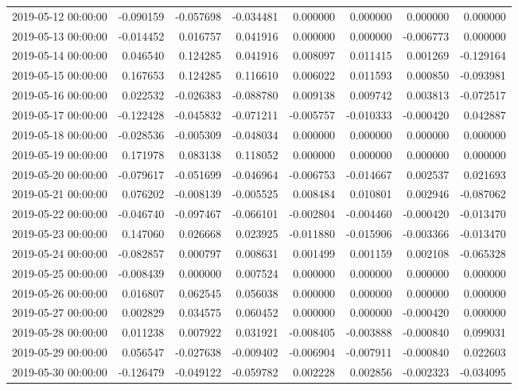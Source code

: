\begin{tabular}{lrrrrrrr}
2019-05-12 00:00:00 & -0.090159 & -0.057698 & -0.034481 & 0.000000 & 0.000000 & 0.000000 & 0.000000 \\
2019-05-13 00:00:00 & -0.014452 & 0.016757 & 0.041916 & 0.000000 & 0.000000 & -0.006773 & 0.000000 \\
2019-05-14 00:00:00 & 0.046540 & 0.124285 & 0.041916 & 0.008097 & 0.011415 & 0.001269 & -0.129164 \\
2019-05-15 00:00:00 & 0.167653 & 0.124285 & 0.116610 & 0.006022 & 0.011593 & 0.000850 & -0.093981 \\
2019-05-16 00:00:00 & 0.022532 & -0.026383 & -0.088780 & 0.009138 & 0.009742 & 0.003813 & -0.072517 \\
2019-05-17 00:00:00 & -0.122428 & -0.045832 & -0.071211 & -0.005757 & -0.010333 & -0.000420 & 0.042887 \\
2019-05-18 00:00:00 & -0.028536 & -0.005309 & -0.048034 & 0.000000 & 0.000000 & 0.000000 & 0.000000 \\
2019-05-19 00:00:00 & 0.171978 & 0.083138 & 0.118052 & 0.000000 & 0.000000 & 0.000000 & 0.000000 \\
2019-05-20 00:00:00 & -0.079617 & -0.051699 & -0.046964 & -0.006753 & -0.014667 & 0.002537 & 0.021693 \\
2019-05-21 00:00:00 & 0.076202 & -0.008139 & -0.005525 & 0.008484 & 0.010801 & 0.002946 & -0.087062 \\
2019-05-22 00:00:00 & -0.046740 & -0.097467 & -0.066101 & -0.002804 & -0.004460 & -0.000420 & -0.013470 \\
2019-05-23 00:00:00 & 0.147060 & 0.026668 & 0.023925 & -0.011880 & -0.015906 & -0.003366 & -0.013470 \\
2019-05-24 00:00:00 & -0.082857 & 0.000797 & 0.008631 & 0.001499 & 0.001159 & 0.002108 & -0.065328 \\
2019-05-25 00:00:00 & -0.008439 & 0.000000 & 0.007524 & 0.000000 & 0.000000 & 0.000000 & 0.000000 \\
2019-05-26 00:00:00 & 0.016807 & 0.062545 & 0.056038 & 0.000000 & 0.000000 & 0.000000 & 0.000000 \\
2019-05-27 00:00:00 & 0.002829 & 0.034575 & 0.060452 & 0.000000 & 0.000000 & -0.000420 & 0.000000 \\
2019-05-28 00:00:00 & 0.011238 & 0.007922 & 0.031921 & -0.008405 & -0.003888 & -0.000840 & 0.099031 \\
2019-05-29 00:00:00 & 0.056547 & -0.027638 & -0.009402 & -0.006904 & -0.007911 & -0.000840 & 0.022603 \\
2019-05-30 00:00:00 & -0.126479 & -0.049122 & -0.059782 & 0.002228 & 0.002856 & -0.002323 & -0.034095 \\

\end{tabular}

